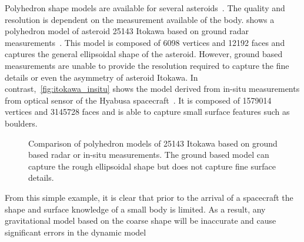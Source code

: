 Polyhedron shape models are available for several asteroids~\cite{neese2004,gaskell2008b}.
The quality and resolution is dependent on the measurement available of the body.
 shows a polyhedron model of asteroid 25143 Itokawa based on ground radar measurements~\cite{neese2004}.
This model is composed of \num{6098} vertices and \num{12192} faces and captures the general ellipsoidal shape of the asteroid.
However, ground based measurements are unable to provide the resolution required to capture the fine details or even the asymmetry of asteroid Itokawa.
In contrast,~\cref{fig:itokawa_insitu} shows the model derived from in-situ measurements from optical sensor of the Hyabusa spacecraft~\cite{gaskell2008a}.
It is composed of \num{1579014} vertices and \num{3145728} faces and is able to capture small surface features such as boulders.
\begin{figure}
    \centering
    \quad
    \caption{Comparison of polyhedron models of 25143 Itokawa based on ground based radar or in-situ measurements.
        The ground based model can capture the rough ellipsoidal shape but does not capture fine surface details.}
\end{figure}
From this simple example, it is clear that prior to the arrival of a spacecraft the shape and surface knowledge of a small body is limited.
As a result, any gravitational model based on the coarse shape will be inaccurate and cause significant errors in the dynamic model

